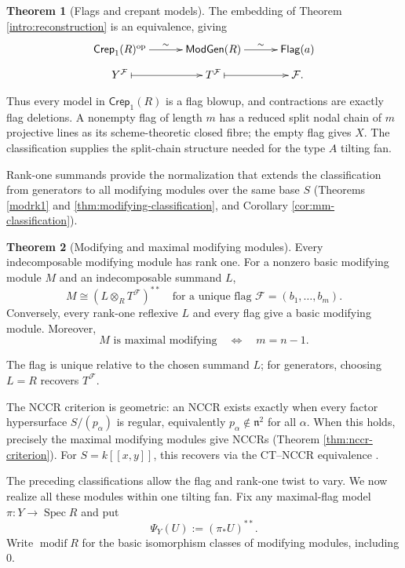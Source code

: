 \documentclass[a4paper,reqno]{amsart}
\def\F{\mathcal{F}}
\def\n{\mathfrak{n}}
\DeclareMathOperator{\op}{op}
\DeclareMathOperator{\Spec}{Spec}
\DeclareMathOperator{\modif}{modif}
\theoremstyle{definition}
\newtheorem{IntroThm}{Theorem}
\begin{document}
\begin{IntroThm}[Flags and crepant models]\label{intro:flags}
The embedding of Theorem \ref{intro:reconstruction} is an equivalence, giving
\[
\xymatrix@C=3em@R=.8em{
\mathsf{Crep}_1(R)^{\op}\ar[r]^-{\sim}
 &\mathsf{ModGen}(R)\ar[r]^-{\sim}&\mathsf{Flag}(a)\\
Y^\F\ar@{|->}[r]&T^\F\ar@{|->}[r]&\F.
}
\]
\end{IntroThm}

Thus every model in $\mathsf{Crep}_1(R)$ is a flag blowup, and contractions are exactly flag deletions. A nonempty flag of length $m$ has a reduced split nodal chain of $m$ projective lines as its scheme-theoretic closed fibre; the empty flag gives $X$. The classification supplies the split-chain structure needed for the type $A$ tilting fan.

Rank-one summands provide the normalization that extends the classification from generators to all modifying modules over the same base $S$ (Theorems \ref{modrk1} and \ref{thm:modifying-classification}, and Corollary \ref{cor:mm-classification}).

\begin{IntroThm}[Modifying and maximal modifying modules]\label{intro:modifying-modules}
Every indecomposable modifying module has rank one. For a nonzero basic modifying module $M$ and an indecomposable summand $L$,
\[
M\cong(L\otimes_RT^\F)^{**}
\quad\text{for a unique flag }\F=(b_1,\ldots,b_m).
\]
Conversely, every rank-one reflexive $L$ and every flag give a basic modifying module. Moreover,
\[
M\text{ is maximal modifying}
\quad\Longleftrightarrow\quad m=n-1.
\]
\end{IntroThm}

The flag is unique relative to the chosen summand $L$; for generators, choosing $L=R$ recovers $T^\F$.

The NCCR criterion is geometric: an NCCR exists exactly when every factor hypersurface $S/(p_\alpha)$ is regular, equivalently $p_\alpha\notin\n^2$ for all $\alpha$. When this holds, precisely the maximal modifying modules give NCCRs (Theorem \ref{thm:nccr-criterion}). For $S=k[[x,y]]$, this recovers \cite[Theorem 5.1(3)]{IW18} via the CT--NCCR equivalence \cite[Corollary 5.9]{IW}.

The preceding classifications allow the flag and rank-one twist to vary. We now realize all these modules within one tilting fan. Fix any maximal-flag model $\pi\colon Y\to\Spec R$ and put
\[
\Psi_Y(U):=(\pi_*U)^{**}.
\]
Write $\modif R$ for the basic isomorphism classes of modifying modules, including $0$.
\end{document}

